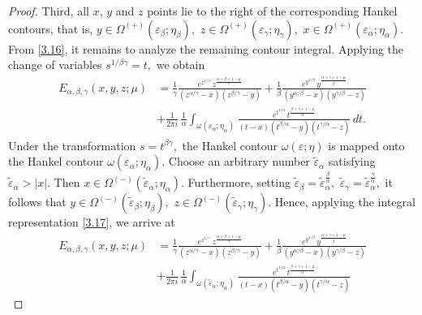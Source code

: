 \documentclass[12pt, reqno]{amsart}
\theoremstyle{definition}
\theoremstyle{remark}
\numberwithin{equation}{section}
\begin{document}
\begin{proof}
Third, all $x$, $y$ and $z$ points lie to the right of the corresponding Hankel contours, that is,
$
y\in\Omega^{(+)}(\varepsilon_\beta;\eta_\beta),
\,\,
z\in\Omega^{(+)}(\varepsilon_\gamma;\eta_\gamma),\,\,x\in\Omega^{(+)}(\varepsilon_\alpha;\eta_\alpha)
$.
From \eqref{3.16}, it remains to analyze the remaining contour integral. Applying the change of variables
$
s^{1/\beta\gamma}=t,
$
we obtain
\begin{equation}\label{3.17}\begin{aligned}
E_{\alpha,\beta,\gamma}(x,y,z;\mu)
&=\frac{1}{\gamma}\frac{
e^{z^{1/\gamma}}
\,z^{\frac{\alpha+\beta+1-\mu}{\gamma}}}
{(z^{\alpha/\gamma}-x)(z^{\beta/\gamma}-y)}+\frac{1}{\beta}\frac{
e^{y^{1/\beta}}
\,y^{\frac{\alpha+\gamma+1-\mu}{\beta}}}
{(y^{\alpha/\beta}-x)(y^{\gamma/\beta}-z)}\\
&+
\frac{1}{2\pi i}\,
\frac{1}{\alpha}
\int_{\omega(\varepsilon_\alpha;\eta_\alpha)}
\frac{
e^{t^{1/\alpha}}
\,t^{\frac{\beta+\gamma+1-\mu}{\alpha}}
}
{
(t-x)(t^{\beta/\alpha}-y)(t^{\gamma/\alpha}-z)
}
\,dt.\end{aligned}\end{equation}
Under the transformation
$
s=t^{\beta\gamma},
$
the Hankel contour
$
\omega(\varepsilon;\eta)
$
is mapped onto the Hankel contour
$
\omega(\varepsilon_\alpha;\eta_\alpha).
$ Choose an arbitrary number $\widetilde{\varepsilon}_{\alpha}$ satisfying
$\widetilde{\varepsilon}_{\alpha}>|x|$. Then
$
x\in\Omega^{(-)}(\widetilde{\varepsilon}_{\alpha};\eta_\alpha).
$
Furthermore, setting
$
\widetilde{\varepsilon}_{\beta}
=\widetilde{\varepsilon}_{\alpha}^{\frac{\beta}{\alpha}},
\,\,
\widetilde{\varepsilon}_{\gamma}
=\widetilde{\varepsilon}_{\alpha}^{\frac{\gamma}{\alpha}},
$
it follows that
$
y\in\Omega^{(-)}(\widetilde{\varepsilon}_{\beta};\eta_\beta),
\,\,
z\in\Omega^{(-)}(\widetilde{\varepsilon}_{\gamma};\eta_\gamma).
$ Hence, applying the integral representation \eqref{3.17}, we arrive at
\begin{equation}\label{3.18}\begin{aligned}
E_{\alpha,\beta,\gamma}(x,y,z;\mu)
&=\frac{1}{\gamma}\frac{
e^{z^{1/\gamma}}
\,z^{\frac{\alpha+\beta+1-\mu}{\gamma}}}
{(z^{\alpha/\gamma}-x)(z^{\beta/\gamma}-y)}+\frac{1}{\beta}\frac{
e^{y^{1/\beta}}
\,y^{\frac{\alpha+\gamma+1-\mu}{\beta}}}
{(y^{\alpha/\beta}-x)(y^{\gamma/\beta}-z)}\\
&+
\frac{1}{2\pi i}\,
\frac{1}{\alpha}
\int_{\omega(\widetilde{\varepsilon}_{\alpha};\eta_\alpha)}
\frac{
e^{t^{1/\alpha}}
\,t^{\frac{\beta+\gamma+1-\mu}{\alpha}}
}
{
(t-x)(t^{\beta/\alpha}-y)(t^{\gamma/\alpha}-z)
}
\end{aligned}
\end{equation}
\end{proof}
\end{document}
